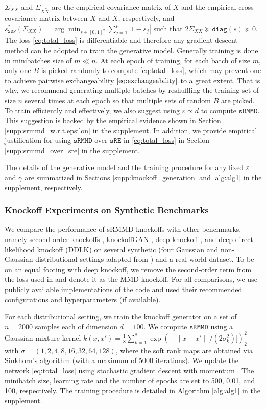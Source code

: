 \documentclass{article}
\theoremstyle{definition}
\newcommand{\sre}{\mathtt{sRE}}
\newcommand{\srmmd}{\mathtt{sRMMD}}
\begin{document}
$\Sigma_{XX}$ and $\Sigma_{X\tilde X}$ are the empirical covariance matrix of $X$ and the empirical cross covariance matrix between $X$ and $\tilde X$, respectively, and {\small $s^*_{\mathtt{SDP}}(\Sigma_{ XX}) =  \arg \min_{s\in [0, 1]^d} \sum_{j=1}^p|1- s_j|$} such that $2 \Sigma_{XX} \succeq \mathtt{diag}(s)\succeq 0$. 
The loss \eqref{eq:total_loss} is differentiable and therefore any gradient descent method can be adopted to train the generative model. Generally training is done in minibatches size of $m \ll n$. At each epoch of training, for each batch of size $m$, only one $B$ is picked randomly to compute \eqref{eq:total_loss}, which may prevent one to achieve pairwise exchangeability $\eqref{eq:exchangeability}$ to a great extent. That is why, we recommend generating multiple batches by reshuffling the training set of size $n$ several times at each epoch so that multiple sets of random $B$ are picked. To train efficiently and effectively, we also suggest using $\varepsilon\propto d$ to compute $\srmmd$. This suggestion is backed by the empirical evidence shown in Section \ref{supp:srmmd_w.r.t.epsilon} in the supplement. In addition, we provide empirical justification for using $\srmmd$ over $\sre$ in \eqref{eq:total_loss} in Section \ref{supp:srmmd_over_sre} in the supplement. 

The details of the generative model and the training procedure for any fixed $\varepsilon$ and $\gamma$ are summarized in Sections \ref{supp:knockoff_generation} and \ref{alg:alg1} in the supplement, respectively.
\subsubsection{Knockoff Experiments on Synthetic Benchmarks}\label{subsec:synthetic_setting}
We compare the performance of sRMMD knockoffs with other benchmarks, namely second-order knockoffs \cite{candes2016panning}, knockoffGAN \cite{jordon2018knockoffgan}, deep knockoff \cite{romano2020deep}, and deep direct likelihood knockoff (DDLK) \cite{sudarshan2020deep} on several synthetic (four Gaussian and non-Gaussian distributional settings adapted from \cite{romano2020deep}) and a real-world dataset. To be on an equal footing with deep knockoff, we remove the second-order term from the loss used in \cite{romano2020deep} and denote it as the MMD knockoff. For all comparisons, we use publicly available implementations of the code and used their recommended configurations and hyperparameters (if available).

For each distributional setting, we train the knockoff generator on a set of $n= 2000$ samples each of dimension $d=100$. We compute $\srmmd$ using a Gaussian mixture kernel $k(x, x') = \frac{1}{8}\sum_{k=1}^8 \exp(-\|x - x'\|/(2 \sigma_k^2)])_2^2$ with $\sigma = (1, 2, 4, 8, 16, 32, 64, 128)$, where the soft rank maps are obtained via Sinkhorn's algorithm (with a maximum of 5000 iterations). We update the network \eqref{eq:total_loss} using stochastic gradient descent with momentum \cite{bottou2012stochastic}. The minibatch size, learning rate and the number of epochs are set to 500, 0.01, and 100, respectively. The training procedure is detailed in Algorithm \ref{alg:alg1} in the supplement. 
\end{document}
